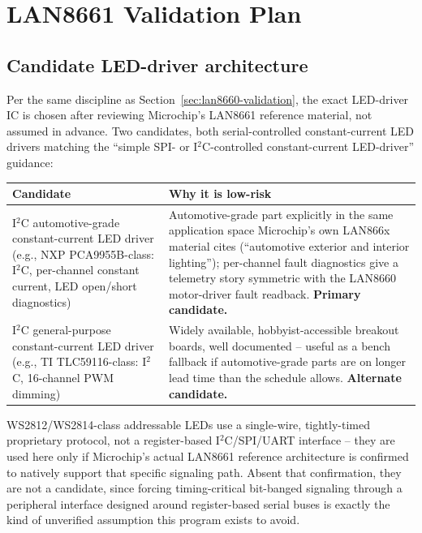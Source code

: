 \section{LAN8661 Validation Plan}
\label{sec:lan8661-validation}

\subsection{Candidate LED-driver architecture}

Per the same discipline as Section~\ref{sec:lan8660-validation}, the exact LED-driver IC is chosen after reviewing Microchip's LAN8661 reference material, not assumed in advance. Two candidates, both serial-controlled constant-current LED drivers matching the ``simple SPI- or I$^2$C-controlled constant-current LED-driver'' guidance:

\begin{center}
\small
\begin{tabularx}{\linewidth}{@{}p{3.2cm} X@{}}
\toprule
\textbf{Candidate} & \textbf{Why it is low-risk} \\
\midrule
I$^2$C automotive-grade constant-current LED driver (e.g., NXP PCA9955B-class: I$^2$C, per-channel constant current, LED open/short diagnostics) & Automotive-grade part explicitly in the same application space Microchip's own LAN866x material cites (``automotive exterior and interior lighting''); per-channel fault diagnostics give a telemetry story symmetric with the LAN8660 motor-driver fault readback. \textbf{Primary candidate.} \\
I$^2$C general-purpose constant-current LED driver (e.g., TI TLC59116-class: I$^2$C, 16-channel PWM dimming) & Widely available, hobbyist-accessible breakout boards, well documented -- useful as a bench fallback if automotive-grade parts are on longer lead time than the schedule allows. \textbf{Alternate candidate.} \\
\bottomrule
\end{tabularx}
\end{center}

\begin{decision}[title={WS2812/WS2814 is explicitly not the default}]
WS2812/WS2814-class addressable LEDs use a single-wire, tightly-timed proprietary protocol, not a register-based I$^2$C/SPI/UART interface -- they are used here only if Microchip's actual LAN8661 reference architecture is confirmed to natively support that specific signaling path. Absent that confirmation, they are not a candidate, since forcing timing-critical bit-banged signaling through a peripheral interface designed around register-based serial buses is exactly the kind of unverified assumption this program exists to avoid.
\end{decision}

